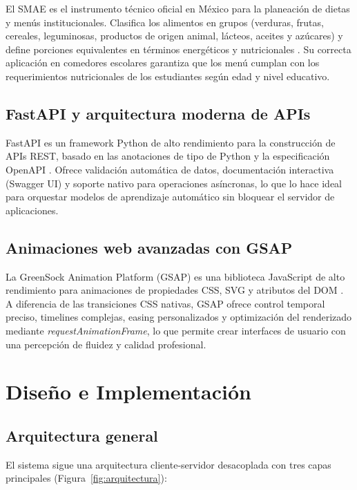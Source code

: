 El SMAE es el instrumento técnico oficial en México para la planeación de dietas y menús institucionales. Clasifica los alimentos en grupos (verduras, frutas, cereales, leguminosas, productos de origen animal, lácteos, aceites y azúcares) y define porciones equivalentes en términos energéticos y nutricionales \cite{instituto_nacional_de_salud_publica_sistema_2024}. Su correcta aplicación en comedores escolares garantiza que los menú cumplan con los requerimientos nutricionales de los estudiantes según edad y nivel educativo.

\subsection{FastAPI y arquitectura moderna de APIs}

FastAPI es un framework Python de alto rendimiento para la construcción de APIs REST, basado en las anotaciones de tipo de Python y la especificación OpenAPI \cite{ramirez_fastapi_2019}. Ofrece validación automática de datos, documentación interactiva (Swagger UI) y soporte nativo para operaciones asíncronas, lo que lo hace ideal para orquestar modelos de aprendizaje automático sin bloquear el servidor de aplicaciones.

\subsection{Animaciones web avanzadas con GSAP}

La GreenSock Animation Platform (GSAP) es una biblioteca JavaScript de alto rendimiento para animaciones de propiedades CSS, SVG y atributos del DOM \cite{greensock_gsap_2024}. A diferencia de las transiciones CSS nativas, GSAP ofrece control temporal preciso, timelines complejas, easing personalizados y optimización del renderizado mediante \textit{requestAnimationFrame}, lo que permite crear interfaces de usuario con una percepción de fluidez y calidad profesional.


\section{Diseño e Implementación}
\label{sec:implementacion}

\subsection{Arquitectura general}

El sistema sigue una arquitectura cliente-servidor desacoplada con tres capas principales (Figura~\ref{fig:arquitectura}):


